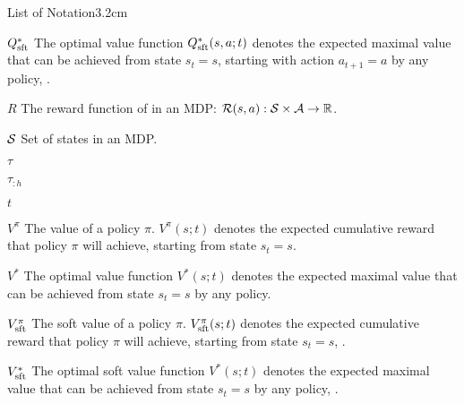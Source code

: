 \begin{mclistof}{List of Notation}{3.2cm}
    \item[$Q_{\textnormal{sft}}^*$]
        The optimal value function $Q_{\textnormal{sft}}^*(s,a;t)$ denotes the expected maximal value that can be achieved from state $s_t=s$, starting with action $a_{t+1}=a$ by any policy, .
    \item[$R$] 
        The reward function of in an MDP: $\mathcal{R}(s,a) : \mathcal{S}\times \mathcal{A}\rightarrow \mathbb{R}$.
    \item[$\mathcal{S}$] 
        Set of states in an MDP. 
    \item[$\tau$] 
    \item[$\tau_{:h}$] 
    \item[$t$] 
    \item[$V^{\pi}$]
        The value of a policy $\pi$. $V^{\pi}(s;t)$ denotes the expected cumulative reward that policy $\pi$ will achieve, starting from state $s_t=s$.
    \item[$V^*$]
        The optimal value function $V^*(s;t)$ denotes the expected maximal value that can be achieved from state $s_t=s$ by any policy.
    \item[$V_{\textnormal{sft}}^{\pi}$]
        The soft value of a policy $\pi$. $V_{\textnormal{sft}}^{\pi}(s;t)$ denotes the expected cumulative reward that policy $\pi$ will achieve, starting from state $s_t=s$, .
    \item[$V_{\textnormal{sft}}^*$]
        The optimal soft value function $V^*(s;t)$ denotes the expected maximal value that can be achieved from state $s_t=s$ by any policy, .
    \\
    

\end{mclistof}
